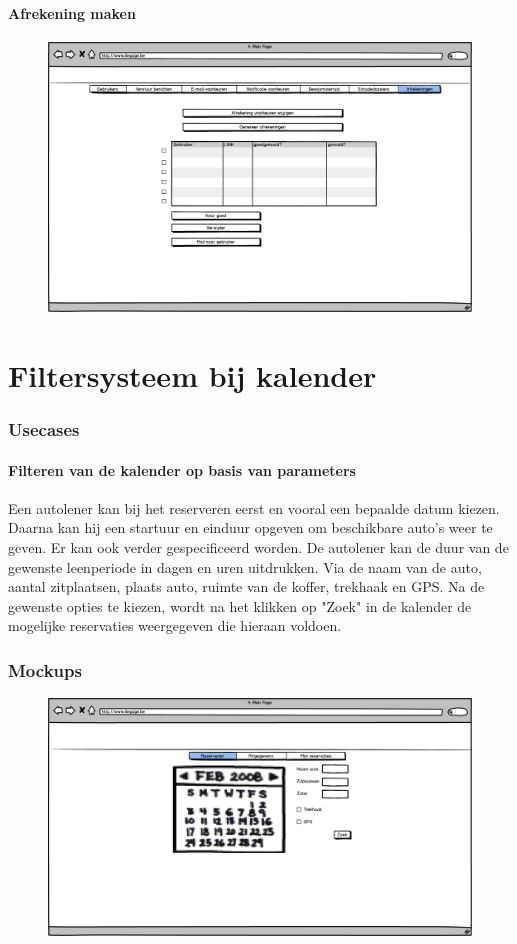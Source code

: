 \documentclass[11pt,a4paper,oneside]{article}
\begin{document}
\subsection{Afrekening maken}
\begin{figure}[H]\includegraphics[width=\textwidth]{../../mockups/admin_afrekeningen.png}\end{figure}
\setcounter{section}{0}
\setcounter{subsection}{0}
\part{Filtersysteem bij kalender}
\section{Usecases}
\subsection{Filteren van de kalender op basis van parameters}
Een autolener kan bij het reserveren eerst en vooral een bepaalde datum kiezen. Daarna kan hij een startuur en einduur opgeven om beschikbare auto's weer te geven. Er kan ook verder gespecificeerd worden. De autolener kan de duur van de gewenste leenperiode in dagen en uren uitdrukken. Via de naam van de auto, aantal zitplaatsen, plaats auto, ruimte van de koffer, trekhaak en GPS. Na de gewenste opties te kiezen, wordt na het klikken op "Zoek" in de kalender de mogelijke reservaties weergegeven die hieraan voldoen.
\section{Mockups}
\begin{figure}[H]\includegraphics[width=\textwidth]{../../mockups/delen_reserveren.png}\end{figure}
\end{document}
